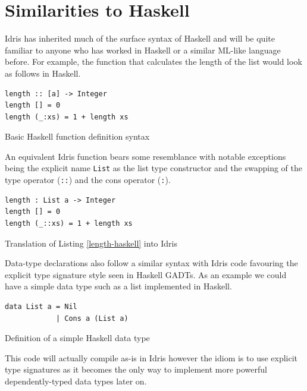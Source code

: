\documentclass[a4paper, notitlepage]{report}
\begin{document}
\section{Similarities to Haskell}
\label{sec:org5f32751}
Idris has inherited much of the surface syntax of Haskell and will be quite
familiar to anyone who has worked in Haskell or a similar ML-like language
before. For example, the function that calculates the length of the list would
look as follows in Haskell.

\begin{listing}[H]
\begin{verbatim}
length :: [a] -> Integer
length [] = 0
length (_:xs) = 1 + length xs
\end{verbatim}
\caption{Basic Haskell function definition syntax \label{length-haskell}}
\end{listing}

An equivalent Idris function bears some resemblance with notable exceptions
being the explicit name \texttt{List} as the list type constructor and the swapping of
the type operator (\texttt{::}) and the cons operator (\texttt{:}).

\begin{listing}[H]
\begin{verbatim}
length : List a -> Integer
length [] = 0
length (_::xs) = 1 + length xs
\end{verbatim}
\caption{Translation of Listing \ref{length-haskell} into Idris}
\end{listing}

Data-type declarations also follow a similar syntax with Idris code favouring
the explicit type signature style seen in Haskell GADTs. As an example we could
have a simple data type such as a list implemented in Haskell.

\begin{listing}[H]
\begin{verbatim}
data List a = Nil
            | Cons a (List a)
\end{verbatim}
\caption{Definition of a simple Haskell data type \label{list-haskell}}
\end{listing}

This code will actually compile as-is in Idris however the idiom is to use
explicit type signatures as it becomes the only way to implement more powerful
dependently-typed data types later on.
\end{document}
